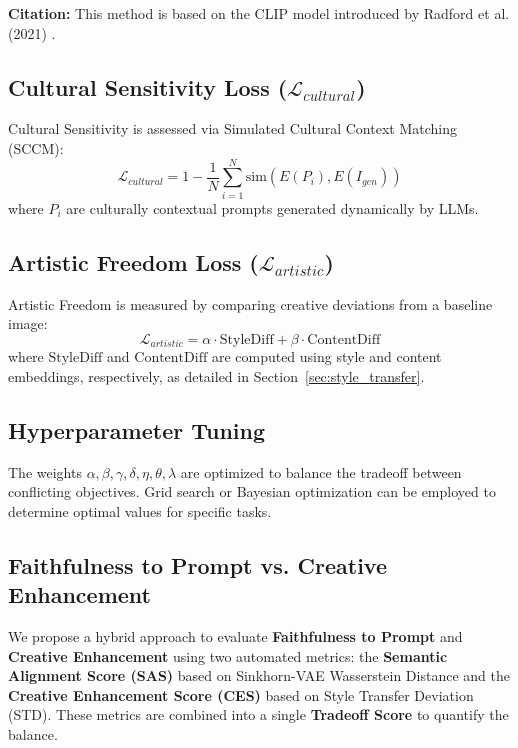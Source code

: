 \textbf{Citation:} This method is based on the CLIP model introduced by Radford et al. (2021) \cite{radford2021learning}.


\subsection{Cultural Sensitivity Loss ($\mathcal{L}_{cultural}$)}
Cultural Sensitivity is assessed via Simulated Cultural Context Matching (SCCM):
\begin{equation}
    \mathcal{L}_{cultural} = 1 - \frac{1}{N} \sum_{i=1}^N \text{sim}(E(P_i), E(I_{gen}))
\end{equation}
where $P_i$ are culturally contextual prompts generated dynamically by LLMs.

\subsection{Artistic Freedom Loss ($\mathcal{L}_{artistic}$)}
Artistic Freedom is measured by comparing creative deviations from a baseline image:
\begin{equation}
    \mathcal{L}_{artistic} = \alpha \cdot \text{StyleDiff} + \beta \cdot \text{ContentDiff}
\end{equation}
where $\text{StyleDiff}$ and $\text{ContentDiff}$ are computed using style and content embeddings, respectively, as detailed in Section~\ref{sec:style_transfer}.

\subsection{Hyperparameter Tuning}
The weights $\alpha, \beta, \gamma, \delta, \eta, \theta, \lambda$ are optimized to balance the tradeoff between conflicting objectives. Grid search or Bayesian optimization can be employed to determine optimal values for specific tasks.



\subsection{Faithfulness to Prompt vs. Creative Enhancement}
We propose a hybrid approach to evaluate \textbf{Faithfulness to Prompt} and \textbf{Creative Enhancement} using two automated metrics: the \textbf{Semantic Alignment Score (SAS)} based on Sinkhorn-VAE Wasserstein Distance and the \textbf{Creative Enhancement Score (CES)} based on Style Transfer Deviation (STD). These metrics are combined into a single \textbf{Tradeoff Score} to quantify the balance.

